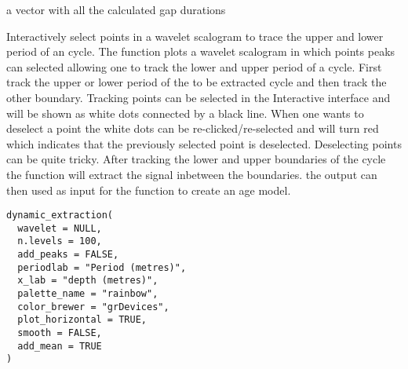 \documentclass[a4paper]{book}
\begin{document}
%
\begin{Value}
a vector with all the calculated gap durations
\end{Value}
%
\begin{Description}
Interactively select points in a wavelet scalogram to trace the upper and
lower period of an cycle.  The  function plots a wavelet scalogram in which points peaks can selected
allowing one to track the lower and upper period of a cycle. First track the upper or lower period of the to
be extracted cycle and then track the other boundary. Tracking points can be selected in the Interactive interface and will be shown as white dots
connected by a black line. When one wants to deselect a point the white dots can be re-clicked/re-selected and will turn red which
indicates that the previously selected point is deselected. Deselecting points can be quite tricky.
After tracking the lower and upper boundaries of the cycle the  function
will extract the signal inbetween the boundaries. the output can then used as input for the
 function to create an age model.
\end{Description}
%
\begin{Usage}
\begin{verbatim}
dynamic_extraction(
  wavelet = NULL,
  n.levels = 100,
  add_peaks = FALSE,
  periodlab = "Period (metres)",
  x_lab = "depth (metres)",
  palette_name = "rainbow",
  color_brewer = "grDevices",
  plot_horizontal = TRUE,
  smooth = FALSE,
  add_mean = TRUE
)
\end{verbatim}
\end{Usage}
%
\end{document}
